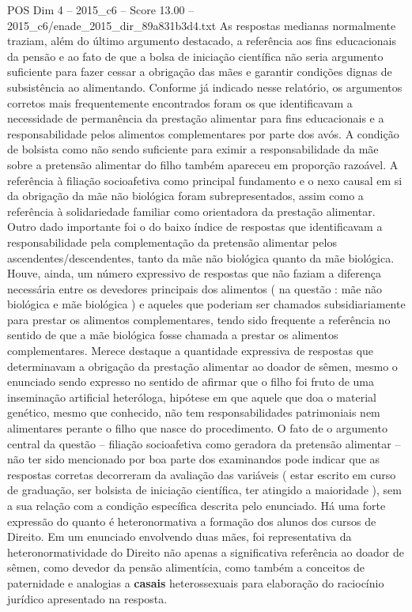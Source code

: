 \begin{textsample}{POS Dim 4 – 2015\_c6 – Score 13.00 – 2015\_c6/enade\_2015\_dir\_89a831b3d4.txt}
As respostas medianas normalmente traziam, além do último argumento destacado, a referência aos fins educacionais da pensão e ao fato de que a bolsa de iniciação científica não seria argumento suficiente para fazer cessar a obrigação das mães e garantir condições dignas de subsistência ao alimentando.
Conforme já indicado nesse relatório, os argumentos corretos mais frequentemente encontrados foram os que identificavam a necessidade de permanência da prestação alimentar para fins educacionais e a responsabilidade pelos alimentos complementares por parte dos avós.
A condição de bolsista como não sendo suficiente para eximir a responsabilidade da mãe sobre a pretensão alimentar do filho também apareceu em proporção razoável.
A referência à filiação socioafetiva como principal fundamento e o nexo causal em si da obrigação da mãe não biológica foram subrepresentados, assim como a referência à solidariedade familiar como orientadora da prestação alimentar.
Outro dado importante foi o do baixo índice de respostas que identificavam a responsabilidade pela complementação da pretensão alimentar pelos ascendentes/descendentes, tanto da mãe não biológica quanto da mãe biológica.
Houve, ainda, um número expressivo de respostas que não faziam a diferença necessária entre os devedores principais dos alimentos ( na questão : mãe não biológica e mãe biológica ) e aqueles que poderiam ser chamados subsidiariamente para prestar os alimentos complementares, tendo sido frequente a referência no sentido de que a mãe biológica fosse chamada a prestar os alimentos complementares.
Merece destaque a quantidade expressiva de respostas que determinavam a obrigação da prestação alimentar ao doador de sêmen, mesmo o enunciado sendo expresso no sentido de afirmar que o filho foi fruto de uma inseminação artificial heteróloga, hipótese em que aquele que doa o material genético, mesmo que conhecido, não tem responsabilidades patrimoniais nem alimentares perante o filho que nasce do procedimento.
O fato de o argumento central da questão – filiação socioafetiva como geradora da pretensão alimentar – não ter sido mencionado por boa parte dos examinandos pode indicar que as respostas corretas decorreram da avaliação das variáveis ( estar escrito em curso de graduação, ser bolsista de iniciação científica, ter atingido a maioridade ), sem a sua relação com a condição específica descrita pelo enunciado.
Há uma forte expressão do quanto é heteronormativa a formação dos alunos dos cursos de Direito.
Em um enunciado envolvendo duas mães, foi representativa da heteronormatividade do Direito não apenas a significativa referência ao doador de sêmen, como devedor da pensão alimentícia, como também a conceitos de paternidade e analogias a \textbf{casais} heterossexuais para elaboração do raciocínio jurídico apresentado na resposta.

\end{textsample}

